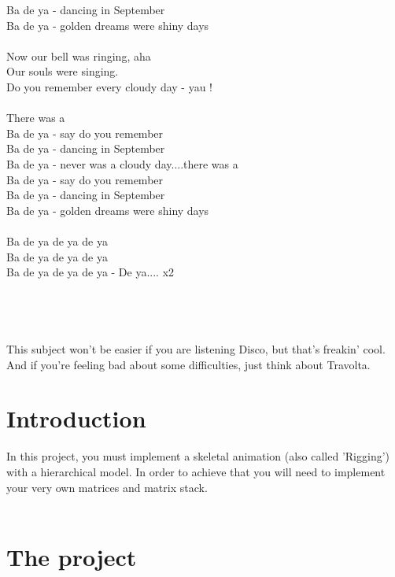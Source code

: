\documentclass{42-en}
\begin{document}
{		Ba de ya - dancing in September\\
		Ba de ya - golden dreams were shiny days\\
		\\
		Now our bell was ringing, aha\\
		Our souls were singing.\\
		Do you remember every cloudy day - yau !\\
		\\
		There was a\\
		Ba de ya - say do you remember\\
		Ba de ya - dancing in September\\
		Ba de ya - never was a cloudy day....there was a\\
		Ba de ya - say do you remember\\
		Ba de ya - dancing in September\\
		Ba de ya - golden dreams were shiny days\\
		\\
		Ba de ya de ya de ya\\
		Ba de ya de ya de ya\\
		Ba de ya de ya de ya - De ya.... {x2}\\
		\\
		\\
		\\
		\\
		This subject won't be easier if you are listening Disco, but that's freakin' cool.\\
		And if you're feeling bad about some difficulties, just think about Travolta.\\
}

\newpage
	\chapter{Introduction}

		In this project, you must implement a skeletal animation (also called 'Rigging') with a hierarchical model. In order to achieve that you will need to implement your very own matrices and matrix stack.\\
		\\

\newpage
	\chapter{The project}
\end{document}
